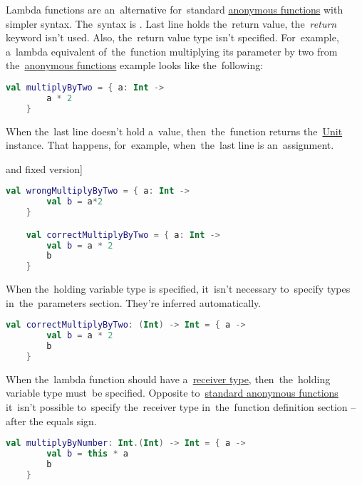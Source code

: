 \label{kotlinlambda}
Lambda functions are an~alternative for~standard \hyperref[kotlinanonymousfunction]{anonymous functions} with simpler syntax.
The~syntax is .
Last line holds the~return value, \mbox{the \textit{return}} keyword isn't used.
Also, the~return value type isn't specified.
For~example, a~lambda equivalent of~the~function multiplying its parameter by two from the~\hyperref[kotlinanonymousfunction]{anonymous functions} example looks like the~following:
\begin{lstlisting}[language=Kotlin]
    val multiplyByTwo = { a: Int ->
        a * 2
    }
\end{lstlisting}
\newline

\noindent When the~last line doesn't hold a~value, then~the~function returns the~\hyperref[kotlinunit]{Unit} instance.
That happens, for~example, when~the~last line is an~assignment.

\example[lambda functions wrongly returning \hyperref[kotlinunit]{Unit} and fixed version]
\begin{lstlisting}[language=Kotlin]
    val wrongMultiplyByTwo = { a: Int ->
        val b = a*2
    }

    val correctMultiplyByTwo = { a: Int ->
        val b = a * 2
        b
    }
\end{lstlisting}
\newline

\noindent When the~holding variable type is specified, it~isn't necessary to~specify types in~the~parameters section.
They're inferred automatically.

\begin{lstlisting}[language=Kotlin]
    val correctMultiplyByTwo: (Int) -> Int = { a ->
        val b = a * 2
        b
    }
\end{lstlisting}
\newline

\noindent When the~lambda function should have a~\hyperref[kotlinanonymousreceivertype]{receiver type}, then~the~holding variable type must~be specified.
Opposite to~\hyperref[kotlinanonymousfunction]{standard anonymous functions} it~isn't possible to~specify the~receiver type in~the~function definition section -- after the equals sign.

\begin{lstlisting}[language=Kotlin]
    val multiplyByNumber: Int.(Int) -> Int = { a ->
        val b = this * a
        b
    }
\end{lstlisting}
\newline


